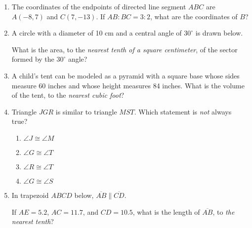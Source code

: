 \documentclass[12pt, oneside]{article}
\begin{document}
\begin{enumerate}[itemsep=2cm]
\item The coordinates of the endpoints of directed line segment $ABC$ are $A(-8,7)$ and $C(7,-13)$. If $AB:BC = 3:2$, what are the coordinates of $B$?

\item A circle with a diameter of 10 cm and a central angle of $30^\circ$ is drawn below.
\begin{center}
  \end{center}
  What is the area, to the \emph{nearest tenth of a square centimeter}, of the sector formed by the $30^\circ$ angle?

\item A child’s tent can be modeled as a pyramid with a square base whose sides measure 60 inches and whose height measures 84 inches. What
is the volume of the tent, to the \emph{nearest cubic foot}?
  

\newpage
\item Triangle $JGR$ is similar to triangle $MST$. Which statement is \emph{not}
always true?
\begin{multicols}{2}
  \begin{enumerate}
    \item $\angle J \cong \angle M$
    \item $\angle G \cong \angle T$ 
    \item $\angle R \cong \angle T$
    \item $\angle G \cong \angle S$
  \end{enumerate}
\end{multicols}

\item In trapezoid $ABCD$ below, $\overline{AB} \parallel \overline{CD}$.
\begin{center}
  \end{center}
If $AE=5.2$, $AC=11.7$, and $CD=10.5$, what is the length of $\overline{AB}$, to \emph{the nearest tenth}?


\end{enumerate}
\end{document}

